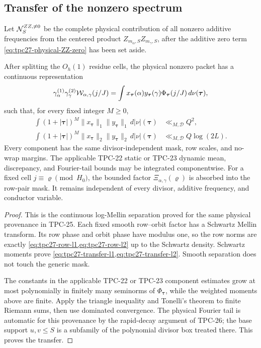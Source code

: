 \subsection{Transfer of the nonzero spectrum}

Let \(\mathcal N_S^{ZZ,\ne0}\) be the complete physical contribution of all
nonzero additive frequencies from the centered product
\(Z_{m_\alpha,S}Z_{m_\gamma,S}\), after the additive zero term
\eqref{eq:tpc27-physical-ZZ-zero} has been set aside.

\begin{lemma}
\label{lem:tpc27-physical-nonzero-transfer}
After splitting the \(O_h(1)\) residue cells, the physical nonzero
packet has a continuous representation
\begin{equation}
 \gamma_\alpha^{(1)}\gamma_\gamma^{(2)}
 \mathcal W_{\alpha,\gamma}(j/J)
 =\int
 x_{\boldsymbol\tau}(\alpha)
 y_{\boldsymbol\tau}(\gamma)
 \Phi_{\boldsymbol\tau}(j/J)
 \,d\nu(\boldsymbol\tau),
 \label{eq:tpc27-continuous-transfer}
\end{equation}
such that, for every fixed integer \(M\ge0\),
\begin{align}
 \int(1+|\boldsymbol\tau|)^M
 \|x_{\boldsymbol\tau}\|_1
 \|y_{\boldsymbol\tau}\|_1
 \,d|\nu|(\boldsymbol\tau)
 &\ll_{M,\mathscr D}Q^2,
 \label{eq:tpc27-transfer-l1}\\
 \int(1+|\boldsymbol\tau|)^M
 \|x_{\boldsymbol\tau}\|_2
 \|y_{\boldsymbol\tau}\|_2
 \,d|\nu|(\boldsymbol\tau)
 &\ll_{M,\mathscr D}Q\log(2L).
 \label{eq:tpc27-transfer-l2}
\end{align}
Every component has the same divisor-independent mask, row scales,
and no-wrap margins.  The applicable TPC-22 static or TPC-23 dynamic
mean, discrepancy, and Fourier-tail bounds may be integrated
componentwise.
For a fixed cell \(j\equiv\varrho\pmod{H_0}\), the bounded factor
\(\Xi_{\alpha,\gamma}(\varrho)\) is absorbed into the row-pair mask.
It remains independent of every divisor, additive frequency, and
conductor variable.
\end{lemma}

\begin{proof}
This is the continuous log-Mellin separation proved for the same
physical provenance in TPC-25.  Each fixed smooth row--orbit factor has
a Schwartz Mellin transform.  Its row phase and orbit phase have
modulus one, so the row norms are exactly
\cref{eq:tpc27-row-l1,eq:tpc27-row-l2} up to the Schwartz density.
Schwartz moments prove
\cref{eq:tpc27-transfer-l1,eq:tpc27-transfer-l2}.  Smooth separation
does not touch the generic mask.

The constants in the applicable TPC-22 or TPC-23 component estimates
grow at most
polynomially in finitely many seminorms of
\(\Phi_{\boldsymbol\tau}\), while the weighted moments above are finite.
Apply the triangle inequality and Tonelli's theorem to finite Riemann
sums, then use dominated convergence.  The physical Fourier tail is
automatic for this provenance by the rapid-decay argument of TPC-26;
the base support \(u,v\le S\) is a subfamily of the polynomial divisor
box treated there.  This proves the transfer.
\end{proof}

